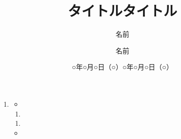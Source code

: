 \begin{enumerate}
  \item\begin{description}
  \item[]
\end{description}\begin{itemize}
  \item
\end{itemize}\begin{enumerate}
  \item
\end{enumerate}\begin{enumerate}
  \item
\end{enumerate}\begin{itemize}
  \item
\end{itemize}
\end{enumerate}\begin{description}
  \item[]
\end{description}
\documentclass{jsarticle}
\usepackage[dvipdfmx]{graphicx}
\setlength{\textheight}{24cm}
\setlength{\topmargin}{-1.5cm}
\setlength{\textwidth}{17cm}
\setlength{\oddsidemargin}{-.5cm}
\usepackage{here}


\title{タイトル}
\author{名前} %
\date{○年○月○日（○）} %


\maketitle

\tableofcontents

\section{はじめに}

\begin{enumerate}
  \item
\end{enumerate}


\documentclass{jsarticle}
\usepackage[dvipdfmx]{graphicx}
\setlength{\textheight}{24cm}
\setlength{\topmargin}{-1.5cm}
\setlength{\textwidth}{17cm}
\setlength{\oddsidemargin}{-.5cm}
\usepackage{here}


\title{タイトル}
\author{名前} %
\date{○年○月○日（○）} %


\maketitle

